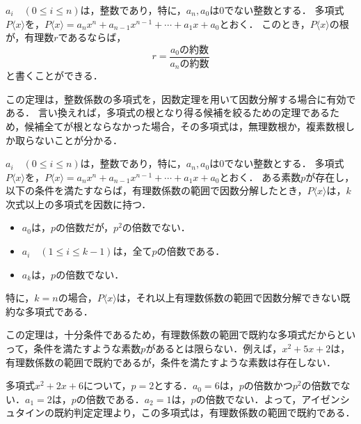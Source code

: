 \begin{theorem}
	$a_i\quad(0 \leq i \leq n)$は，整数であり，特に，$a_n, a_0$は$0$でない整数とする．
	多項式$P\langle x\rangle$を，$P\langle x\rangle = a_nx^n+a_{n-1}x^{n-1}+\cdots+a_1x+a_0$とおく．
	このとき，$P\langle x\rangle$の根が，有理数$r$であるならば，
	\[
	r = \frac{\text{$a_0$の約数}}{\text{$a_n$の約数}}
	\]
	と書くことができる．
\end{theorem}
\begin{rem*}
	この定理は，整数係数の多項式を，因数定理を用いて因数分解する場合に有効である．
	言い換えれば，多項式の根となり得る候補を絞るための定理であるため，候補全てが根とならなかった場合，その多項式は，無理数根か，複素数根しか取らないことが分かる．
\end{rem*}
\begin{theorem}[アイゼンシュタインの既約判定定理]
	$a_i\quad(0 \leq i \leq n)$は，整数であり，特に，$a_n, a_0$は$0$でない整数とする．
	多項式$P\langle x\rangle$を，$P\langle x\rangle = a_nx^n+a_{n-1}x^{n-1}+\cdots+a_1x+a_0$とおく．
	ある素数$p$が存在し，以下の条件を満たすならば，有理数係数の範囲で因数分解したとき，$P\langle x\rangle$は，$k$次式以上の多項式を因数に持つ．
	\begin{itemize}
		\item $a_0$は，$p$の倍数だが，$p^2$の倍数でない．
		\item $a_i\quad(1 \leq i \leq k-1)$は，全て$p$の倍数である．
		\item $a_k$は，$p$の倍数でない．
	\end{itemize}

	特に，$k = n$の場合，$P\langle x\rangle$は，それ以上有理数係数の範囲で因数分解できない既約な多項式である．
\end{theorem}
\begin{rem*}
	この定理は，十分条件であるため，有理数係数の範囲で既約な多項式だからといって，条件を満たすような素数$p$があるとは限らない．例えば，$x^2+5x+2$は，有理数係数の範囲で既約であるが，条件を満たすような素数は存在しない．
\end{rem*}
\begin{example*}
	多項式$x^2+2x+6$について，$p = 2$とする．$a_0 = 6$は，$p$の倍数かつ$p^2$の倍数でない．$a_1 = 2$は，$p$の倍数である．$a_2 = 1$は，$p$の倍数でない．よって，アイゼンシュタインの既約判定定理より，この多項式は，有理数係数の範囲で既約である．
\end{example*}


